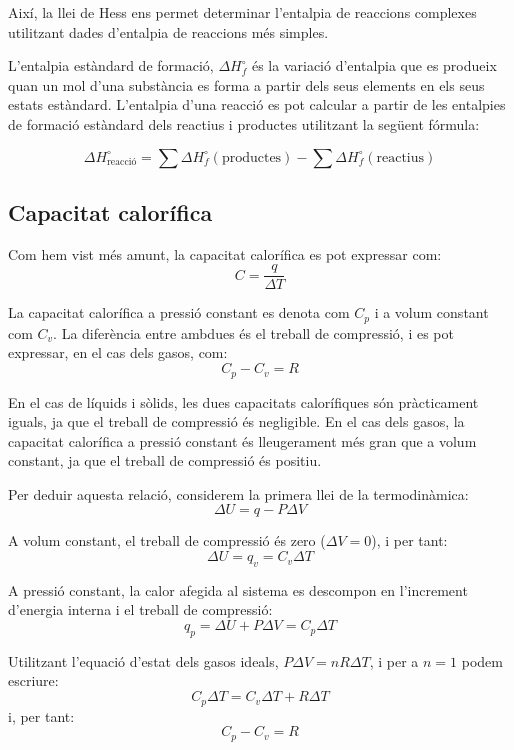 Així, la llei de Hess ens permet determinar l'entalpia de reaccions complexes utilitzant dades d'entalpia de reaccions més simples.

L'entalpia estàndard de formació, $\Delta H_f^\circ$ és la variació d'entalpia que es produeix quan un mol d'una substància es forma a partir dels seus elements en els seus estats estàndard. L'entalpia d'una reacció es pot calcular a partir de les entalpies de formació estàndard dels reactius i productes utilitzant la següent fórmula:

\begin{equation}
\Delta H^\circ_{\text{reacció}} = \sum \Delta H^\circ_f (\text{productes}) - \sum \Delta H^\circ_f (\text{reactius})
\end{equation}

\subsection{Capacitat calorífica}   

Com hem vist més amunt, la capacitat calorífica es pot expressar com:
\begin{equation}
    C = \frac{q}{\Delta T}
\end{equation}

La capacitat calorífica a pressió constant es denota com $C_p$ i a volum constant com $C_v$. La diferència entre ambdues és el treball de compressió, i es pot expressar, en el cas dels gasos, com:
\begin{equation}
    C_p - C_v = R
\end{equation}

En el cas de líquids i sòlids, les dues capacitats calorífiques són pràcticament iguals, ja que el treball de compressió és negligible. En el cas dels gasos, la capacitat calorífica a pressió constant és lleugerament més gran que a volum constant, ja que el treball de compressió és positiu. 

\begin{mybox}[title=Relació entre la capacitat calorífica a pressió constant i a volum constant] 
Per deduir aquesta relació, considerem la primera llei de la termodinàmica:
\[
    \Delta U = q - P \Delta V
\]

A volum constant, el treball de compressió és zero ($\Delta V = 0$), i per tant:
\[
    \Delta U = q_v = C_v \Delta T
\]

A pressió constant, la calor afegida al sistema es descompon en l'increment d'energia interna i el treball de compressió:
\[
    q_p = \Delta U + P \Delta V = C_p \Delta T
\]

Utilitzant l'equació d'estat dels gasos ideals, $P \Delta V = nR \Delta T$, i per a $n = 1$ podem escriure:
\[
    C_p \Delta T = C_v \Delta T + R \Delta T
\]
 i, per tant:
\[
    C_p - C_v = R
\]

\end{mybox}

